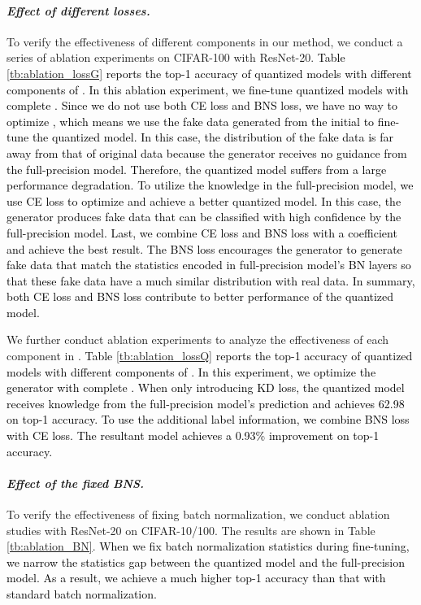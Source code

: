 \documentclass[runningheads]{llncs}
\def\lhk{\textcolor{black}}
\def\jing{\textcolor{black}}
\def\new{\textcolor{black}}
\begin{document}
\paragraph{\emph{\textbf{Effect of different losses.}}}
To verify the effectiveness of different components in our method, we conduct a series of ablation experiments on CIFAR-100 with ResNet-20. 
\lhk{Table \ref{tb:ablation_lossG} reports the top-1 accuracy of quantized models with different components of . In this ablation experiment, we fine-tune quantized models with complete . Since we do not use both CE loss and BNS loss, we have no way to optimize , which means we use the fake data generated from the initial  to fine-tune the quantized model. In this case, the distribution of the fake data is far away from that of original data because the generator \new{receives} no guidance from the full-precision model. Therefore, the quantized model suffers \jing{from a large} performance degradation. To utilize the knowledge in the full-precision model, we use CE loss to optimize  and achieve a better quantized model. In this case, the generator produces fake data that can be classified with high confidence by the full-precision model. Last, we combine CE loss and BNS loss with a coefficient and achieve the best result. The BNS loss encourages the generator to generate fake data that match the statistics encoded in full-precision model's BN layers so that these fake data have \new{a} much similar distribution with real data. In summary, \jing{both CE loss and BNS loss contribute to better performance of the quantized model.}}

We further conduct ablation experiments to analyze the effectiveness of each component in .
\lhk{Table \ref{tb:ablation_lossQ} reports the top-1 accuracy of quantized models with different components of . In this experiment, we optimize the generator with complete . When only introducing KD loss, the quantized model receives knowledge from the full-precision model's prediction and achieves 62.98 on top-1 accuracy. To use the additional label information, we combine BNS loss with CE loss. \jing{The resultant model achieves a 0.93\% improvement on top-1 accuracy. }}

\paragraph{\emph{\textbf{Effect of the fixed BNS.}}}
To verify the effectiveness of fixing batch normalization, we conduct ablation studies with ResNet-20 on CIFAR-10/100. The results are shown in Table \ref{tb:ablation_BN}. 
\lhk{When we fix batch normalization statistics during fine-tuning, we narrow the statistics gap between the quantized model and the full-precision model. As a result, we achieve a much higher top-1 accuracy than that with standard batch normalization. }
\end{document}
